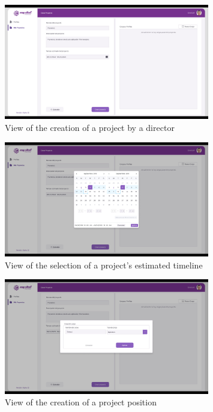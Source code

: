 \documentclass{scrreprt}
\begin{document}
\begin{figure}[H]
	\centering \small
	\includegraphics[width=0.8\textwidth]{WebPrototype/wflow-8.jpeg}
	\caption{View of the creation of a project by a director}
\end{figure}

\begin{figure}[H]
	\centering \small
	\includegraphics[width=0.8\textwidth]{WebPrototype/wflow-9.jpeg}
	\caption{View of the selection of a project's estimated timeline}
\end{figure}

\begin{figure}[H]
	\centering \small
	\includegraphics[width=0.8\textwidth]{WebPrototype/wflow-10.jpeg}
	\caption{View of the creation of a project position}
\end{figure}
\end{document}
